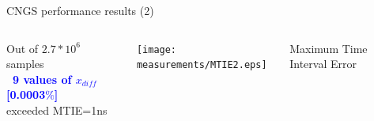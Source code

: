\documentclass[compress,red]{beamer}
\begin{document}
\begin{frame}{CNGS performance results (2)}

  \begin{columns}[c]
	\begin{center}

	    Out of $2.7*10^6$ samples\\
			\textbf{\textcolor{blue}{~9 values of $x_{diff}$ [0.0003$\%$]}} \\
                       exceeded MTIE=1ns
		
% 
	\end{center}
		\vspace{0.08cm}
		\begin{center}
		\texttt{[image: measurements/MTIE2.eps]}
		\end{center}
		\begin{center}
		Maximum Time Interval Error
		\end{center}
  \end{columns}
  \begin{columns}[c]

  \end{columns}
\end{frame}
\end{document}
